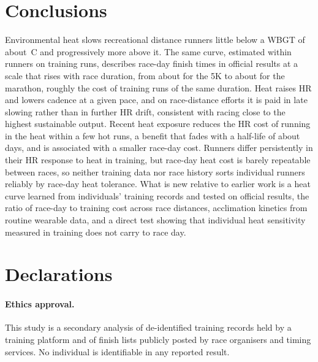 \documentclass[12pt]{article}
\newcommand{\degC}{\,\textdegree C}
\begin{document}
\section{Conclusions}
Environmental heat slows recreational distance runners little below a WBGT of about \flatToWBGT\degC{} and progressively more above it. The same curve, estimated within runners on training runs, describes race-day finish times in official results at a scale that rises with race duration, from about \alphaFiveKRound{} for the 5K to about \alphaMarRound{} for the marathon, roughly \ratioRound{} the cost of training runs of the same duration. Heat raises HR and lowers cadence at a given pace, and on race-distance efforts it is paid in late slowing rather than in further HR drift, consistent with racing close to the highest sustainable output. Recent heat exposure reduces the HR cost of running in the heat within a few hot runs, a benefit that fades with a half-life of about \kinDecayRound{} days, and is associated with a smaller race-day cost. Runners differ persistently in their HR response to heat in training, but race-day heat cost is barely repeatable between races, so neither training data nor race history sorts individual runners reliably by race-day heat tolerance. What is new relative to earlier work is a heat curve learned from individuals' training records and tested on official results, the ratio of race-day to training cost across race distances, acclimation kinetics from routine wearable data, and a direct test showing that individual heat sensitivity measured in training does not carry to race day.

\section*{Declarations}
\paragraph{Ethics approval.}  This study is a secondary analysis of de-identified training records held by a training platform and of finish lists publicly posted by race organisers and timing services. No individual is identifiable in any reported result.
\end{document}
